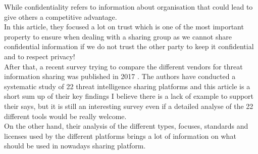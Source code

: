 \documentclass{eplmastersthesis}
\begin{document}
While confidentiality refers to information about organisation that could lead to give others a competitive advantage.\\
In this article, they focused a lot on trust which is one of the most important property to ensure when dealing with a sharing group as we cannot share confidential information if we do not trust the other party to keep it confidential and to respect privacy! \\

After that, a recent survey trying to compare the different vendors for threat information sharing was published in 2017 \cite{sauerwein2017threat}. The authors have conducted a systematic study of 22 threat intelligence sharing platforms and this article is a short sum up of their key findings I believe there is a lack of example to support their says, but it is still an interesting survey even if a detailed analyse of the 22 different tools would be really welcome.\\
On the other hand, their analysis of the different types, focuses, standards and licenses used by the different platforms brings a lot of information on what should be used in nowadays sharing platform.\\
\end{document}
